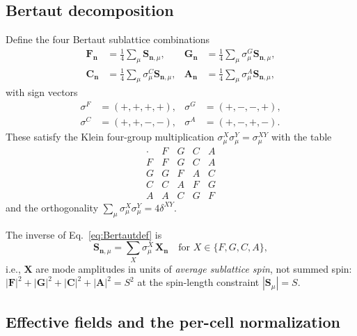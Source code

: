 \documentclass[reprint,amsmath,amssymb,aps,prb,longbibliography]{revtex4-2}
\newcommand{\bfS}{\mathbf{S}}
\newcommand{\bfF}{\mathbf{F}}
\newcommand{\bfG}{\mathbf{G}}
\newcommand{\bfA}{\mathbf{A}}
\newcommand{\bfC}{\mathbf{C}}
\newcommand{\bfX}{\mathbf{X}}
\newcommand{\quart}{\tfrac{1}{4}}
\begin{document}
\subsection{Bertaut decomposition}
\label{sec:Bertautalg}

Define the four Bertaut sublattice combinations
\begin{equation}
\begin{aligned}
\bfF_{\mathbf n} &= \quart\sum_\mu\bfS_{\mathbf n,\mu}, &
\bfG_{\mathbf n} &= \quart\sum_\mu\sigma^G_\mu\bfS_{\mathbf n,\mu},\\
\bfC_{\mathbf n} &= \quart\sum_\mu\sigma^C_\mu\bfS_{\mathbf n,\mu}, &
\bfA_{\mathbf n} &= \quart\sum_\mu\sigma^A_\mu\bfS_{\mathbf n,\mu},
\end{aligned}
\label{eq:Bertautdef}
\end{equation}
with sign vectors
\begin{equation}
\begin{aligned}
\sigma^F&=(+,+,+,+), & \sigma^G&=(+,-,-,+),\\
\sigma^C&=(+,+,-,-), & \sigma^A&=(+,-,+,-).
\end{aligned}
\label{eq:sigmavecs}
\end{equation}
These satisfy the Klein four-group multiplication
$\sigma^X_\mu\sigma^Y_\mu = \sigma^{XY}_\mu$ with the table
\begin{equation}
\begin{array}{c|cccc}
\cdot & F & G & C & A \\
\hline
F & F & G & C & A \\
G & G & F & A & C \\
C & C & A & F & G \\
A & A & C & G & F
\end{array}
\label{eq:Klein4}
\end{equation}
and the orthogonality $\sum_\mu \sigma^X_\mu\sigma^Y_\mu = 4\delta^{XY}$.

The inverse of Eq.~\eqref{eq:Bertautdef} is
\begin{equation}
\bfS_{\mathbf n,\mu} = \sum_X \sigma^X_\mu\,\bfX_{\mathbf n}\quad
\text{for }X\in\{F,G,C,A\},
\label{eq:Bertautinv}
\end{equation}
i.e., $\bfX$ are mode amplitudes in units of \emph{average sublattice
spin}, not summed spin: $|\bfF|^2+|\bfG|^2+|\bfC|^2+|\bfA|^2 = S^2$ at
the spin-length constraint $|\bfS_\mu|=S$.

\subsection{Effective fields and the per-cell normalization}
\label{sec:Heffnorm}
\end{document}
